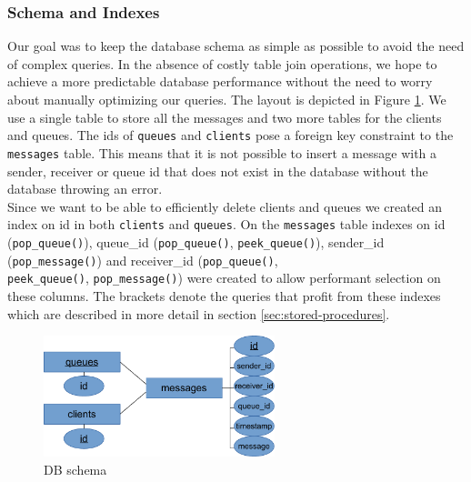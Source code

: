 \documentclass[11pt]{article}
\begin{document}
\subsubsection{Schema and Indexes}\label{sec:schema-and-indexes}
Our goal was to keep the database schema as simple as possible to avoid the need of complex queries. In the absence of costly table join operations, we hope to achieve a more predictable database performance without the need to worry about manually optimizing our queries. The layout is depicted in Figure \ref{fig:dbschema}. We use a single table to store all the messages and two more tables for the clients and queues. The ids of \texttt{queues} and \texttt{clients} pose a foreign key constraint to the \texttt{messages} table. This means that it is not possible to insert a message with a sender, receiver or queue id that does not exist in the database without the database throwing an error.\\
Since we want to be able to efficiently delete clients and queues we created an index on id in both \texttt{clients} and \texttt{queues}.
On the \texttt{messages} table indexes on id (\texttt{pop\_queue()}), queue\_id (\texttt{pop\_queue()}, \texttt{peek\_queue()}), sender\_id (\texttt{pop\_message()}) and receiver\_id (\texttt{pop\_queue()}, \\\texttt{peek\_queue()}, \texttt{pop\_message()}) were created to allow performant selection on these columns. The brackets denote the queries that profit from these indexes which are described in more detail in section \ref{sec:stored-procedures}.
\begin{figure}[ht!]
  \begin{center}
    \includegraphics[width=0.6\textwidth]{figures/dbschema.pdf}
    \caption{DB schema}
    \label{fig:dbschema}
  \end{center}
\end{figure}
\end{document}
